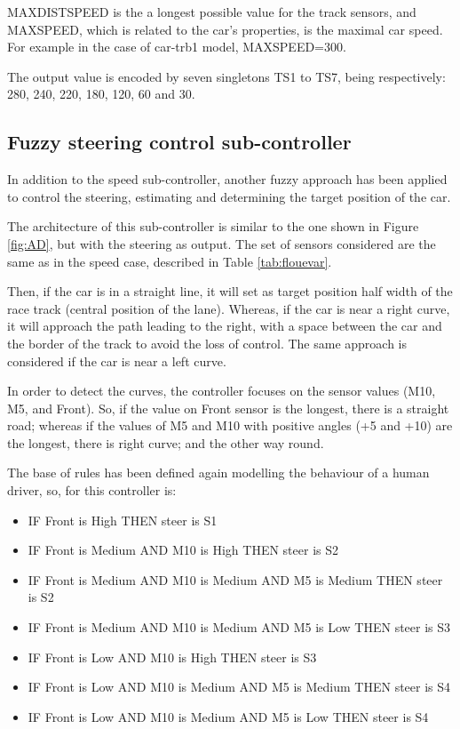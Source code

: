 \documentclass[runningheads,a4paper]{llncs}
\begin{document}
	MAXDISTSPEED is the a longest possible value for the track sensors, and MAXSPEED, which is related to the car's properties, is the maximal car speed. For example in the case of car-trb1 model, MAXSPEED=300.
	
	The output value is encoded by seven singletons TS1 to TS7, being respectively: 280, 240, 220, 180, 120, 60 and 30.
	
	
	\subsection{Fuzzy steering control sub-controller}	
	
	In addition to the speed sub-controller, another fuzzy approach has been applied to control the steering, estimating and determining the target position of the car. 
	
	The architecture of this sub-controller is similar to the one shown in Figure \ref{fig:AD}, but with the steering as output. The set of sensors considered are the same as in the speed case, described in Table \ref{tab:flouevar}.
	
	Then, if the car is in a straight line, it will set as target position half width of the race track (central position of the lane).	Whereas, if the car is near a right curve, it will approach the path leading to the right, with a space between the car and the border of the track to avoid the loss of control. The same approach is considered if the car is near a left curve.
	
	In order to detect the curves, the controller focuses on the sensor values (M10, M5, and Front). So, if the value on Front sensor is the longest, there is a straight road; whereas if the values of M5 and M10 with positive angles (+5 and +10) are the longest, there is right curve; and the other way round.
	
	The base of rules has been defined again modelling the behaviour of a human driver, so, for this controller is:
	
	\begin{itemize}		
		\item IF Front is High THEN steer is S1
		\item IF Front is Medium AND M10 is High THEN  steer is S2
		\item IF Front is Medium AND M10 is Medium AND M5 is Medium THEN steer is S2
		\item IF Front is Medium AND M10 is Medium AND M5 is Low THEN steer is S3
		\item IF Front is Low AND M10 is High THEN steer is S3
		\item IF Front is Low AND M10 is Medium AND M5 is Medium THEN steer is S4
		\item IF Front is Low AND M10 is Medium AND M5 is Low THEN steer is S4
	\end{itemize}	
	
\end{document}
